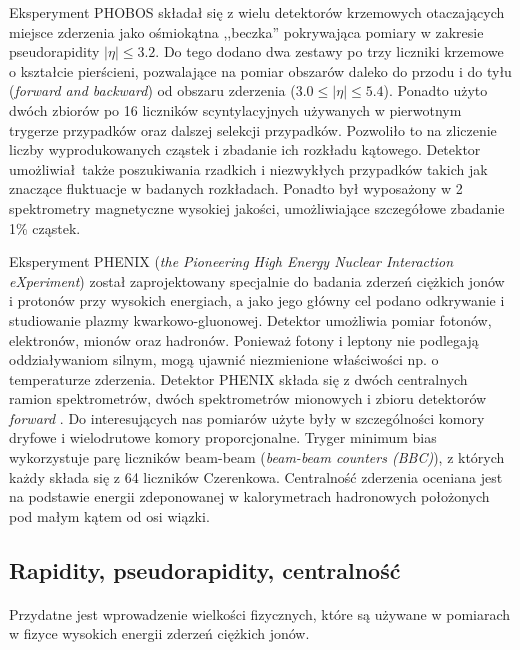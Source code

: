 \documentclass[a4paper,12pt]{article}
\begin{document}
Eksperyment PHOBOS składał się z wielu detektorów krzemowych otaczających miejsce zderzenia jako ośmiokątna ,,beczka'' pokrywająca pomiary w zakresie pseudorapidity $|\eta| \le 3.2$. Do tego dodano dwa zestawy po trzy liczniki krzemowe o kształcie pierścieni, pozwalające na pomiar obszarów daleko do przodu i do tyłu (\textit{forward and backward}) od obszaru zderzenia ($3.0 \le |\eta| \le 5.4$). Ponadto użyto dwóch zbiorów po 16 liczników scyntylacyjnych używanych w pierwotnym trygerze przypadków oraz dalszej selekcji przypadków\cite{Back:2004mr}. Pozwoliło to na zliczenie liczby wyprodukowanych cząstek i zbadanie ich rozkładu kątowego. Detektor umożliwiał także poszukiwania rzadkich i niezwykłych przypadków takich jak znaczące fluktuacje w badanych rozkładach. Ponadto był wyposażony w 2 spektrometry magnetyczne wysokiej jakości, umożliwiające szczegółowe zbadanie 1\% cząstek. 

Eksperyment PHENIX (\textit{the Pioneering High Energy Nuclear Interaction eXperiment}) został zaprojektowany specjalnie do badania zderzeń ciężkich jonów i protonów przy wysokich energiach, a jako jego główny cel podano odkrywanie i studiowanie plazmy kwarkowo-gluonowej. Detektor umożliwia pomiar fotonów, elektronów, mionów oraz hadronów. Ponieważ fotony i leptony nie podlegają oddziaływaniom silnym, mogą ujawnić niezmienione właściwości np. o temperaturze zderzenia. Detektor PHENIX składa się z dwóch centralnych ramion spektrometrów, dwóch spektrometrów mionowych i zbioru detektorów \textit{forward} \cite{Adare:2015bua}. Do interesujących nas pomiarów użyte były w szczególności komory dryfowe i wielodrutowe komory proporcjonalne. Tryger minimum bias wykorzystuje parę liczników beam-beam (\textit{beam-beam counters (BBC)}), z których każdy składa się z 64 liczników Czerenkowa. Centralność zderzenia oceniana jest na podstawie energii zdeponowanej w kalorymetrach hadronowych położonych pod małym kątem od osi wiązki.

\subsection{Rapidity, pseudorapidity, centralność}
\paragraph{}
Przydatne jest wprowadzenie wielkości fizycznych, które są używane w pomiarach w fizyce wysokich energii zderzeń ciężkich jonów.
\end{document}
